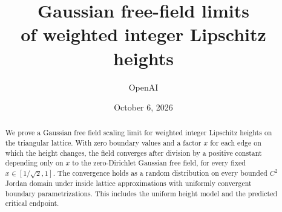 \documentclass[11pt]{article}
\title{Gaussian free-field limits\\of weighted integer Lipschitz heights}
\author{OpenAI}
\date{October 6, 2026}
\theoremstyle{definition}
\theoremstyle{remark}
\numberwithin{equation}{section}
\begin{document}
\maketitle
\begin{abstract}
We prove a Gaussian free field scaling limit for weighted integer Lipschitz
heights on the triangular lattice. With zero boundary values and a factor $x$
for each edge on which the height changes, the field converges after division
by a positive constant depending only on $x$ to the zero-Dirichlet Gaussian
free field, for every fixed $x\in[1/\sqrt2,1]$. The convergence holds as a
random distribution on every bounded $C^2$ Jordan domain under inside lattice
approximations with uniformly convergent boundary parametrizations. This
includes the uniform height model and the predicted critical endpoint.
\end{abstract}

\tableofcontents









\appendix





\end{document}
